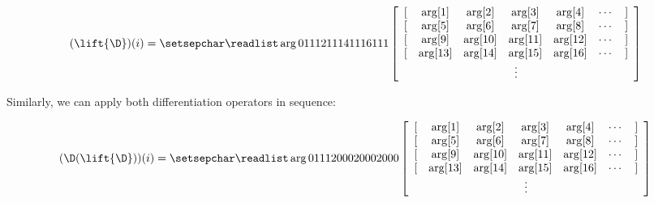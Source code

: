 $$(\lift{\D})(i) = \ssa{0 1 1 1 2 1 1 1 4 1 1 1 6 1 1 1}$$

Similarly, we can apply both differentiation operators in sequence:

$$(\D(\lift{\D}))(i) = \ssa{0 1 1 1 2 0 0 0 2 0 0 0 2 0 0 0}$$

\begin{comment}
\subsubsection{Matrix representations of nested streams}\label{sec:matrix-picture}

Similar to the vector graphical representations from \refsec{sec:vector-picture},
we can use a graphical representation of a nested stream $s$:

$\mtrx{0 0 0 0}$

The four rectangles correspond to the following expressions:
$$
\begin{aligned}
\I(\lift{\I}(s))[t_0-1][t_1-1] = \I(\zm(\lift{\I}(\lift{\zm})))[t_0][t_1] =& \mtrx{1 0 0 0} \\
\I(s)[t_0][t_1-1] = \I(\zm(s))[t_0][t_1] =& \mtrx{0 1 0 0} \\
\lift{\I(s)}[t_0-1][t_1] = \lift{\I(\lift{\zm})}(s)[t_0][t_1] =& \mtrx{0 0 1 0} \\
s[t_0][t_1] =& \mtrx{0 0 0 1}.
\end{aligned}
$$

Lifting a vector we obtain a matrix, e.g.:
$\lift{\strm{1 0}} = \mtrx{1 0 1 0}$.

Consider a bilinear scalar operator $\times$.  Let us expand the following expression:
$\inc{(\lift{(\inc{(\lift{(a \times b)})})})}$.

In Section~\ref{sec:vector-picture} we expanded the inner term
$$
\begin{aligned}
\inc{(\lift{a \times b})} = &\matmult{\strm{1 0}}{\strm{0 1}} \\
&\matmult{\strm{0 1}}{\strm{1 0}} \\
&\matmult{\strm{0 1}}{\strm{0 1}}
\end{aligned}
$$

Lifting this term again we get:

$$
\begin{aligned}
\lift{(\inc{(\lift{(a \times b)})})} =&
\matmult{\mtrx{1 0 1 0}}{\mtrx{0 1 0 1}} +\\
&\matmult{\mtrx{0 1 0 1}}{\mtrx{1 0 1 0}} +\\
&\matmult{\mtrx{0 1 0 1}}{\mtrx{0 1 0 1}}
\end{aligned}
$$


\end{comment}
